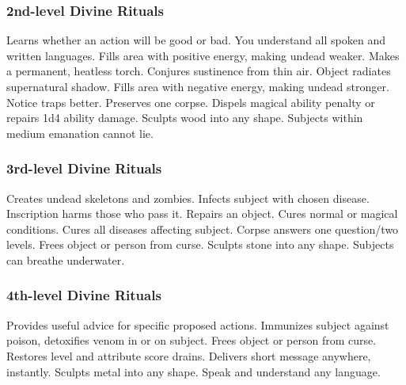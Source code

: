 \subsubsection{2nd-level Divine Rituals}
\begin{rituallist}
    \M\F Learns whether an action will be good or bad.
     You understand all spoken and written languages.
     Fills area with positive energy, making undead weaker.
     Makes a permanent, heatless torch.
     Conjures sustinence from thin air.
     Object radiates supernatural shadow.
     Fills area with negative energy, making undead stronger.
     Notice traps better.
     Preserves one corpse.
     Dispels magical ability penalty or repairs 1d4 ability damage.
     Sculpts wood into any shape.
     Subjects within medium emanation cannot lie.
\end{rituallist}

\subsubsection{3rd-level Divine Rituals}
\begin{rituallist}
     Creates undead skeletons and zombies.
     Infects subject with chosen disease.
    \M Inscription harms those who pass it.
     Repairs an object.
     Cures normal or magical conditions.
     Cures all diseases affecting subject.
     Corpse answers one question/two levels.
     Frees object or person from curse.
     Sculpts stone into any shape.
     Subjects can breathe underwater.
\end{rituallist}

\subsubsection{4th-level Divine Rituals}
\begin{rituallist}
     Provides useful advice for specific proposed actions.
     Immunizes subject against poison, detoxifies venom in or on subject.
     Frees object or person from curse.
     Restores level and attribute score drains.
     Delivers short message anywhere, instantly.
     Sculpts metal into any shape.
     Speak and understand any language.
\end{rituallist}

